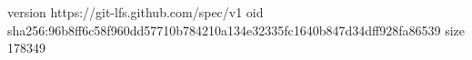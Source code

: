 version https://git-lfs.github.com/spec/v1
oid sha256:96b8ff6c58f960dd57710b784210a134e32335fc1640b847d34dff928fa86539
size 178349
